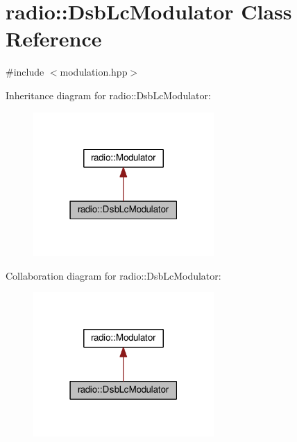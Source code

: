\hypertarget{classradio_1_1DsbLcModulator}{\section{radio\+:\+:Dsb\+Lc\+Modulator Class Reference}
\label{classradio_1_1DsbLcModulator}
}


{\ttfamily \#include $<$modulation.\+hpp$>$}



Inheritance diagram for radio\+:\+:Dsb\+Lc\+Modulator\+:
\nopagebreak
\begin{figure}[H]
\begin{center}
\leavevmode
\includegraphics[width=195pt]{classradio_1_1DsbLcModulator__inherit__graph}
\end{center}
\end{figure}


Collaboration diagram for radio\+:\+:Dsb\+Lc\+Modulator\+:
\nopagebreak
\begin{figure}[H]
\begin{center}
\leavevmode
\includegraphics[width=195pt]{classradio_1_1DsbLcModulator__coll__graph}
\end{center}
\end{figure}
